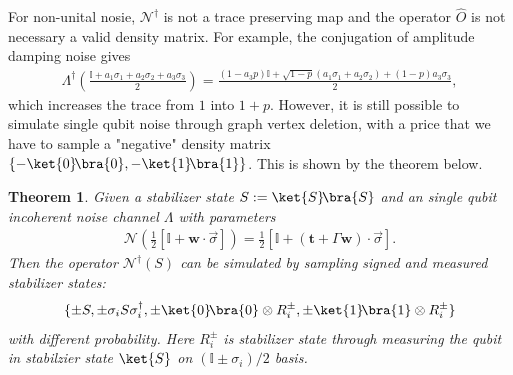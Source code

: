 \documentclass[aps,%
twocolumn,%
floatfix,%
pra,%
amsfonts,%
longbibliography,%
groupedaddress,%
superscriptaddress]{revtex4-2}%
\newtheorem{theorem}{Theorem}
\newcommand{\1}{\mathbbm{1}}
\begin{document}
For non-unital nosie,  $\mathcal{N}^\dagger$ is not a trace preserving map and the operator $\hat O$ is not necessary a valid density matrix. 
For example, the conjugation of amplitude damping noise gives
\begin{align}
    \Lambda^\dagger(\frac{\mathbb{I} + a_1 \sigma_1 + a_2 \sigma_2 + a_3 \sigma_3}{2}) = \frac{(1 - a_3p)\mathbb{I} +\sqrt{1- p}\left( a_1 \sigma_1 + a_2 \sigma_2\right) + (1 - p)a_3 \sigma_3}{2},
\end{align}
which increases the trace from $1$ into $1 + p$. However, it is still possible to simulate single qubit noise through graph vertex deletion, with a price that we have to sample a "negative" density matrix $\{-\ket{0}\!\bra{0}, -\ket{1}\!\bra{1}\}$.
This is shown by the theorem below.

\begin{theorem}
\label{theo:sampling_nonunital_noise}
    Given a stabilizer state $S:=\ket{S}\!\bra{S}$ and an single qubit incoherent noise channel $\Lambda$ with parameters
 \begin{align}
    \mathcal{N}\left(\frac{1}{2}[\mathbb{I} + \mathbf{w} \cdot \vec \sigma]\right) = \frac{1}{2}[\mathbb{I} + (\mathbf{t} + \Gamma\mathbf{w}) \cdot  \vec\sigma] .
 \end{align}
Then the operator  $\mathcal{N}^\dagger(S)$ can be simulated by sampling signed and measured stabilizer states:
\begin{align}
    \{\pm S, \pm \sigma_i S \sigma_i^\dagger,\pm \ket{0}\!\bra{0} \otimes R_i^{\pm}, \pm\ket{1}\!\bra{1} \otimes R_i^{\pm}\}
\end{align}
with different probability. Here $R_i^{\pm}$ is stabilizer state through measuring the qubit in stabilzier state $\ket{S}$ on $(\mathbb{I} \pm \sigma_i)/2$ basis.
\end{theorem}
\end{document}
